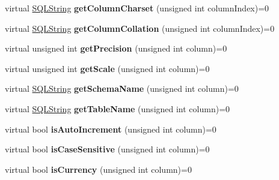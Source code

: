 \begin{DoxyCompactItemize}
virtual \hyperlink{classsql_1_1_s_q_l_string}{S\+Q\+L\+String} {\bfseries get\+Column\+Charset} (unsigned int column\+Index)=0
\item 
\hypertarget{classsql_1_1_result_set_meta_data_a5413e319ca46d35f0d124a17e7c76f16}{}\label{classsql_1_1_result_set_meta_data_a5413e319ca46d35f0d124a17e7c76f16} 
virtual \hyperlink{classsql_1_1_s_q_l_string}{S\+Q\+L\+String} {\bfseries get\+Column\+Collation} (unsigned int column\+Index)=0
\item 
\hypertarget{classsql_1_1_result_set_meta_data_a3b98280734852f341d945da2bf1b6f08}{}\label{classsql_1_1_result_set_meta_data_a3b98280734852f341d945da2bf1b6f08} 
virtual unsigned int {\bfseries get\+Precision} (unsigned int column)=0
\item 
\hypertarget{classsql_1_1_result_set_meta_data_a6829f31b06652989c35a6711d497e977}{}\label{classsql_1_1_result_set_meta_data_a6829f31b06652989c35a6711d497e977} 
virtual unsigned int {\bfseries get\+Scale} (unsigned int column)=0
\item 
\hypertarget{classsql_1_1_result_set_meta_data_a248333fa45e0d144e0b022cc101b94b8}{}\label{classsql_1_1_result_set_meta_data_a248333fa45e0d144e0b022cc101b94b8} 
virtual \hyperlink{classsql_1_1_s_q_l_string}{S\+Q\+L\+String} {\bfseries get\+Schema\+Name} (unsigned int column)=0
\item 
\hypertarget{classsql_1_1_result_set_meta_data_abed4ba31b56f085e8d819e909f3ca88e}{}\label{classsql_1_1_result_set_meta_data_abed4ba31b56f085e8d819e909f3ca88e} 
virtual \hyperlink{classsql_1_1_s_q_l_string}{S\+Q\+L\+String} {\bfseries get\+Table\+Name} (unsigned int column)=0
\item 
\hypertarget{classsql_1_1_result_set_meta_data_a72008ce595ed3b8e5b1a7a605e7030a9}{}\label{classsql_1_1_result_set_meta_data_a72008ce595ed3b8e5b1a7a605e7030a9} 
virtual bool {\bfseries is\+Auto\+Increment} (unsigned int column)=0
\item 
\hypertarget{classsql_1_1_result_set_meta_data_a4bef38b42e162b47c9b93da6a8bc7243}{}\label{classsql_1_1_result_set_meta_data_a4bef38b42e162b47c9b93da6a8bc7243} 
virtual bool {\bfseries is\+Case\+Sensitive} (unsigned int column)=0
\item 
\hypertarget{classsql_1_1_result_set_meta_data_a81edbdc7333d1c81885ffc1aec74d8ae}{}\label{classsql_1_1_result_set_meta_data_a81edbdc7333d1c81885ffc1aec74d8ae} 
virtual bool {\bfseries is\+Currency} (unsigned int column)=0
\item 
\hypertarget{classsql_1_1_result_set_meta_data_acc01892faa78711c218e028515bc0444}{}\label{classsql_1_1_result_set_meta_data_acc01892faa78711c218e028515bc0444} 

\end{DoxyCompactItemize}

